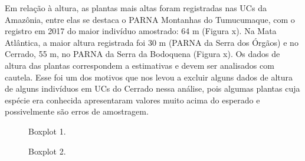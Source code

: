 \documentclass[
  letterpaper,
]{scrbook}
\begin{document}
Em relação à altura, as plantas mais altas foram registradas nas UCs da
Amazônia, entre elas se destaca o PARNA Montanhas do Tumucumaque, com o
registro em 2017 do maior indivíduo amostrado: 64 m (Figura x). Na Mata
Atlântica, a maior altura registrada foi 30 m (PARNA da Serra dos
Órgãos) e no Cerrado, 55 m, no PARNA da Serra da Bodoquena (Figura x).
Os dados de altura das plantas correspondem a estimativas e devem ser
analisados com cautela. Esse foi um dos motivos que nos levou a excluir
alguns dados de altura de alguns indivíduos em UCs do Cerrado nessa
análise, pois algumas plantas cuja espécie era conhecida apresentaram
valores muito acima do esperado e possivelmente são erros de amostragem.

\begin{figure}[H]


\caption{\label{fig-boxplot1}Boxplot 1.}

\end{figure}%

\begin{figure}[H]


\caption{\label{fig-boxplot2}Boxplot 2.}

\end{figure}%
\end{document}
